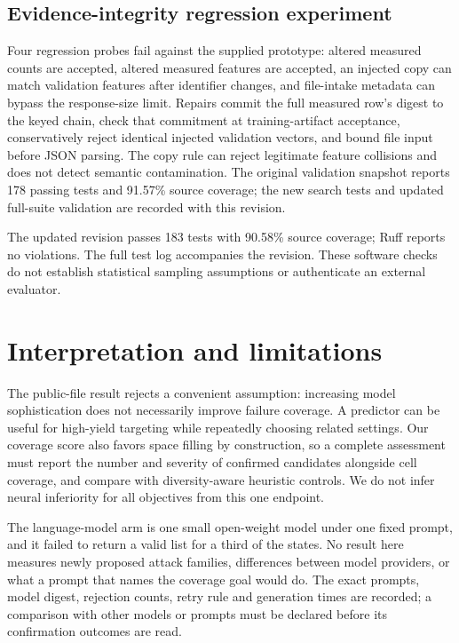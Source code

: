 \documentclass[11pt]{article}
\begin{document}
\subsection{Evidence-integrity regression experiment}
Four regression probes fail against the supplied prototype: altered measured counts are accepted, altered measured features are accepted, an injected copy can match validation features after identifier changes, and file-intake metadata can bypass the response-size limit. Repairs commit the full measured row's digest to the keyed chain, check that commitment at training-artifact acceptance, conservatively reject identical injected validation vectors, and bound file input before JSON parsing. The copy rule can reject legitimate feature collisions and does not detect semantic contamination. The original validation snapshot reports 178 passing tests and 91.57\% source coverage; the new search tests and updated full-suite validation are recorded with this revision.

The updated revision passes 183 tests with 90.58\% source coverage; Ruff reports no violations. The full test log accompanies the revision. These software checks do not establish statistical sampling assumptions or authenticate an external evaluator.

\section{Interpretation and limitations}
The public-file result rejects a convenient assumption: increasing model sophistication does not necessarily improve failure coverage. A predictor can be useful for high-yield targeting while repeatedly choosing related settings. Our coverage score also favors space filling by construction, so a complete assessment must report the number and severity of confirmed candidates alongside cell coverage, and compare with diversity-aware heuristic controls. We do not infer neural inferiority for all objectives from this one endpoint.

The language-model arm is one small open-weight model under one fixed prompt, and it failed to return a valid list for a third of the states. No result here measures newly proposed attack families, differences between model providers, or what a prompt that names the coverage goal would do. The exact prompts, model digest, rejection counts, retry rule and generation times are recorded; a comparison with other models or prompts must be declared before its confirmation outcomes are read.
\end{document}
